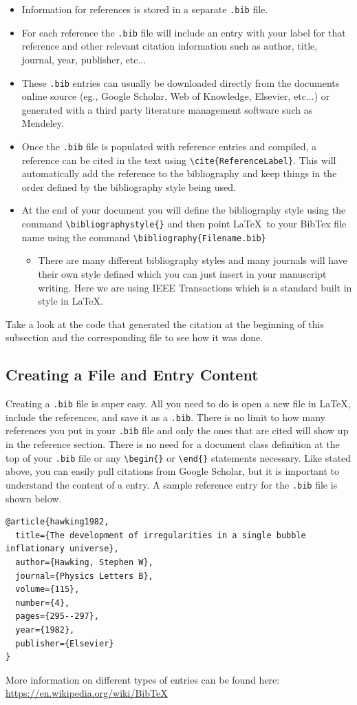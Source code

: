 \documentclass[]{article}%
\newcommand{\bs}{\textbackslash}
\newcommand{\TT}[1]{\texttt{#1}}
\newcommand{\tpc}{\textperiodcentered}
\theoremstyle{definition}
\begin{document}
\begin{itemize}
	\item Information for references is stored in a separate \TT{.bib} file.
	\item For each reference the \TT{.bib} file will include an entry with your label for that reference and other relevant citation information such as author, title, journal, year, publisher, etc...
	\item These \TT{.bib} entries can usually be downloaded directly from the documents online source (eg., Google Scholar, Web of Knowledge, Elsevier, etc...) or generated with a third party literature management software such as Mendeley.
	\item Once the \TT{.bib} file is populated with reference entries and compiled, a reference can be cited in the text using \TT{\bs cite\{ReferenceLabel\}}.
	This will automatically add the reference to the bibliography and keep things in the order defined by the bibliography style being used.
	\item At the end of your document you will define the bibliography style using the command \TT{\bs bibliographystyle\{\tpc\}} and then point \LaTeX\ to your BibTex file name using the command \TT{\bs bibliography\{Filename.bib\}}
	\begin{itemize}
		\item There are many different bibliography styles and many journals will have their own style defined which you can just insert in your manuscript writing.
		Here we are using IEEE Transactions which is a standard built in style in \LaTeX.
	\end{itemize}
\end{itemize}
Take a look at the code that generated the citation at the beginning of this subsection and the corresponding  file to see how it was done.

\subsection{Creating a  File and Entry Content}
Creating a \TT{.bib} file is super easy.
All you need to do is open a new file in \LaTeX, include the references, and save it as a \TT{.bib}.
There is no limit to how many references you put in your \TT{.bib} file and only the ones that are cited will show up in the reference section.
There is no need for a document class definition at the top of your \TT{.bib} file or any \TT{\bs begin\{\tpc\}} or \TT{\bs end\{\tpc\}} statements necessary.
Like stated above, you can easily pull  citations from Google Scholar, but it is important to understand the content of a  entry.
A sample reference entry for the \TT{.bib} file is shown below.
\begin{verbatim}
@article{hawking1982,
  title={The development of irregularities in a single bubble inflationary universe},
  author={Hawking, Stephen W},
  journal={Physics Letters B},
  volume={115},
  number={4},
  pages={295--297},
  year={1982},
  publisher={Elsevier}
}
\end{verbatim}
More information on different types of entries can be found here: \url{https://en.wikipedia.org/wiki/BibTeX}
\end{document}
